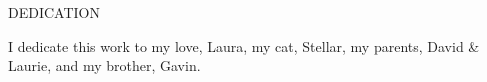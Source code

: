 \begin{center}
DEDICATION
\end{center}

I dedicate this work to my love, Laura, my cat, Stellar, my parents, David \& Laurie, and my brother, Gavin.
